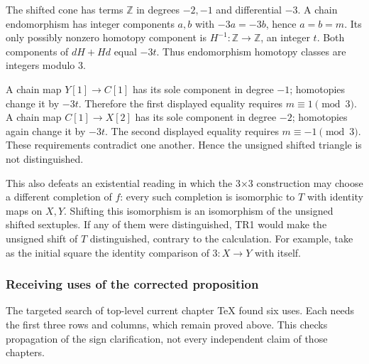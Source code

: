 The shifted cone has terms \(\mathbb Z\) in degrees \(-2,-1\) and differential \(-3\). A chain endomorphism has integer components \(a,b\) with \(-3a=-3b\),\allowbreak{} hence \(a=b=m\). Its only possibly nonzero homotopy component is \(H^{-1}:\mathbb Z\to\mathbb Z\),\allowbreak{} an integer \(t\). Both components of \(dH+Hd\) equal \(-3t\). Thus endomorphism homotopy classes are integers modulo 3.

A chain map \(Y[1]\to C[1]\) has its sole component in degree \(-1\); homotopies change it by \(-3t\). Therefore the first displayed equality requires \(m\equiv1\pmod3\). A chain map \(C[1]\to X[2]\) has its sole component in degree \(-2\); homotopies again change it by \(-3t\). The second displayed equality requires \(m\equiv-1\pmod3\). These requirements contradict one another. Hence the unsigned shifted triangle is not distinguished.

This also defeats an existential reading in which the 3×3 construction may choose a different completion of \(f\):\allowbreak{} every such completion is isomorphic to \(T\) with identity maps on \(X,Y\). Shifting this isomorphism is an isomorphism of the unsigned shifted sextuples. If any of them were distinguished,\allowbreak{} TR1 would make the unsigned shift of \(T\) distinguished,\allowbreak{} contrary to the calculation. For example,\allowbreak{} take as the initial square the identity comparison of \(3:X\to Y\) with itself.

\subsubsection{Receiving uses of the corrected proposition}\label{proofs-0001-1140-receiving-uses-of-the-corrected-proposition}

The targeted search of top-level current chapter TeX found six uses. Each needs the first three rows and columns,\allowbreak{} which remain proved above. This checks propagation of the sign clarification,\allowbreak{} not every independent claim of those chapters.

